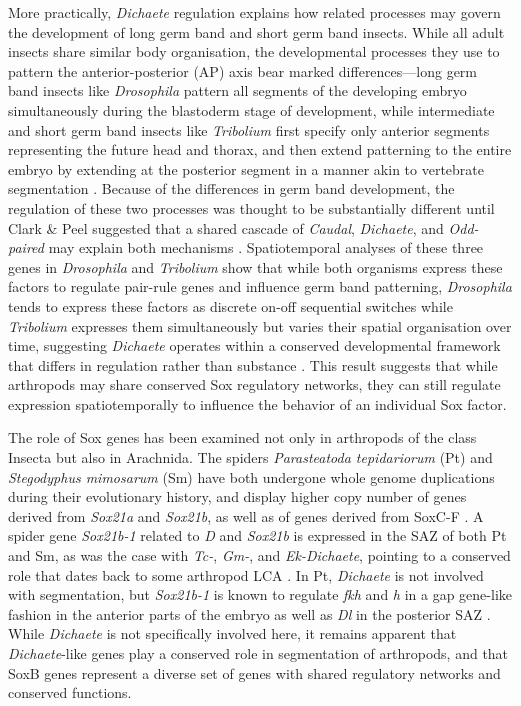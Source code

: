 \documentclass[withindex,glossary]{cam-thesis}
\begin{document}
More practically, \emph{Dichaete} regulation explains how related
processes may govern the development of long germ band and short germ
band insects. While all adult insects share similar body organisation,
the developmental processes they use to pattern the anterior-posterior
(\gls{AP}) axis bear marked differences---long germ band insects like
\emph{Drosophila} pattern all segments of the developing embryo
simultaneously during the blastoderm stage of development, while
intermediate and short germ band insects like \emph{Tribolium} first
specify only anterior segments representing the future head and thorax,
and then extend patterning to the entire embryo by extending at the
posterior segment in a manner akin to vertebrate segmentation . Because of the differences in germ band development, the
regulation of these two processes was thought to be substantially
different until Clark \& Peel suggested that a shared cascade of
\emph{Caudal}, \emph{Dichaete}, and \emph{Odd-paired} may explain both
mechanisms . Spatiotemporal analyses of these three
genes in \emph{Drosophila} and \emph{Tribolium} show that while both
organisms express these factors to regulate pair-rule genes and
influence germ band patterning, \emph{Drosophila} tends to express these
factors as discrete on-off sequential switches while \emph{Tribolium}
expresses them simultaneously but varies their spatial organisation over
time, suggesting \emph{Dichaete} operates within a conserved
developmental framework that differs in regulation rather than substance
. This result suggests that while arthropods may
share conserved Sox regulatory networks, they can still regulate
expression spatiotemporally to influence the behavior of an individual
Sox factor.

The role of Sox genes has been examined not only in arthropods of the
class Insecta but also in Arachnida. The spiders \emph{Parasteatoda
tepidariorum} (\gls{Pt}) and \emph{Stegodyphus mimosarum} (\gls{Sm}) have both
undergone whole genome duplications during their evolutionary history,
and display higher copy number of genes derived from \emph{Sox21a} and
\emph{Sox21b}, as well as of genes derived from SoxC-F . A spider gene \emph{Sox21b-1} related to \emph{D} and
\emph{Sox21b} is expressed in the SAZ of both Pt and Sm, as was the case
with \emph{Tc-}, \emph{Gm-}, and \emph{Ek-Dichaete}, pointing to a
conserved role that dates back to some arthropod LCA . In Pt, \emph{Dichaete} is not involved
with segmentation, but \emph{Sox21b-1} is known to regulate \emph{fkh}
and \emph{h} in a gap gene-like fashion in the anterior parts of the
embryo as well as \emph{Dl} in the posterior SAZ .
While \emph{Dichaete} is not specifically involved here, it remains
apparent that \emph{Dichaete}-like genes play a conserved role in
segmentation of arthropods, and that SoxB genes represent a diverse set
of genes with shared regulatory networks and conserved functions.
\end{document}
